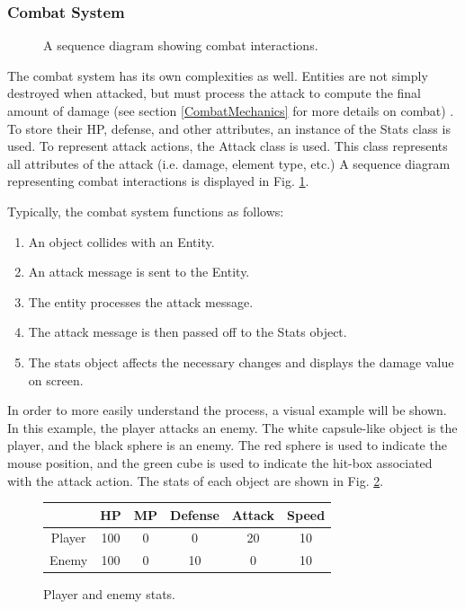 \documentclass{article}
\begin{document}
\subsubsection{Combat System}

\begin{figure}[h!]


\caption{A sequence diagram showing combat interactions.}
\label{CombatInteractions}

\end{figure}

The combat system has its own complexities as well.  Entities are not simply destroyed when attacked, but must process the attack to compute the final amount of damage (see section \ref{CombatMechanics} for more details on combat) .  To store their HP, defense, and other attributes, an instance of the Stats class is used.  To represent attack actions, the Attack class is used.  This class represents all attributes of the attack (i.e. damage, element type, etc.)  A sequence diagram representing combat interactions is displayed in Fig. \ref{CombatInteractions}.

Typically, the combat system functions as follows:
\begin{enumerate}

\item An object collides with an Entity.
\item An attack message is sent to the Entity.
\item The entity processes the attack message.
\item The attack message is then passed off to the Stats object.
\item The stats object affects the necessary changes and displays the damage value on screen.

\end{enumerate}

In order to more easily understand the process, a visual example will be shown.  In this example, the player attacks an enemy.  The white capsule-like object is the player, and the black sphere is an enemy.  The red sphere is used to indicate the mouse position, and the green cube is used to indicate the hit-box associated with the attack action.  The stats of each object are shown in Fig. \ref{Stats}.

\begin{figure}[h!]
\begin{tabular}{|c|c|c|c|c|c|}
\hline
		&	HP	&	MP	&	Defense	&	Attack	&	Speed \\ \hline
Player	&	100	&	0	&	0	&	20	&	10 \\ \hline
Enemy	&	100	&	0	&	10	&	0	&	10 \\ \hline

\end{tabular}
\caption{Player and enemy stats.}
\label{Stats}
\end{figure}
\end{document}
